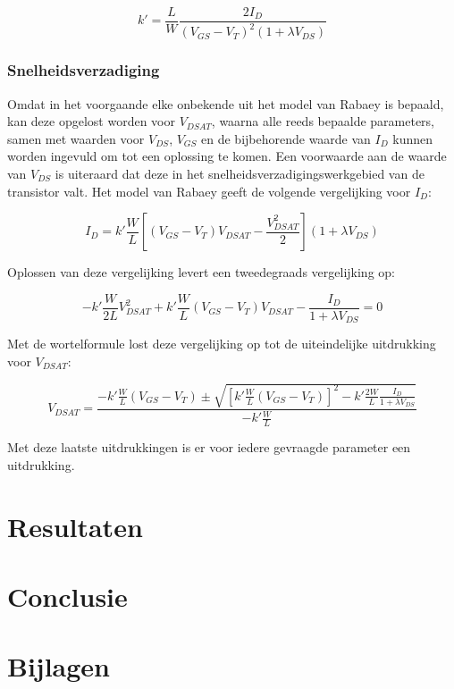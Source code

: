 \documentclass{article}
\begin{document}
\begin{equation} \label{eq:ump-kprime}
	k' = \frac{L}{W}\frac{2I_{D}}{(V_{GS} - V_{T})^2(1 + \lambda V_{DS})}
\end{equation}

\subsubsection{Snelheidsverzadiging}
\label{subsubsec:ump-methode-verw-lambda}
Omdat in het voorgaande elke onbekende uit het model van Rabaey is bepaald, kan deze opgelost worden voor $V_{DSAT}$, waarna alle reeds bepaalde parameters, samen met waarden voor $V_{DS}$, $V_{GS}$ en de bijbehorende waarde van $I_{D}$ kunnen worden ingevuld om tot een oplossing te komen. Een voorwaarde aan de waarde van $V_{DS}$ is uiteraard dat deze in het snelheidsverzadigingswerkgebied van de transistor valt. Het model van Rabaey geeft de volgende vergelijking voor $I_{D}$:

\begin{equation}
	I_{D} = k' \frac{W}{L}[(V_{GS} - V_{T})V_{DSAT} - \frac{V_{DSAT}^2}{2}](1 + \lambda V_{DS})
\end{equation}

Oplossen van deze vergelijking levert een tweedegraads vergelijking op:

$$-k'\frac{W}{2L}V_{DSAT}^2 + k'\frac{W}{L}(V_{GS}-V_{T})V_{DSAT} - \frac{I_{D}}{1 + \lambda V_{DS}} = 0$$

Met de wortelformule lost deze vergelijking op tot de uiteindelijke uitdrukking voor $V_{DSAT}$:

\begin{equation} \label{eq:ump-vdsat}
	V_{DSAT} = \frac{-k'\frac{W}{L}(V_{GS}-V_{T}) \pm \sqrt{[k'\frac{W}{L}(V_{GS}-V_{T})]^2 - k'\frac{2W}{L}\frac{I_{D}}{1 + \lambda V_{DS}}}}{-k'\frac{W}{L}}
\end{equation}

Met deze laatste uitdrukkingen is er voor iedere gevraagde parameter een uitdrukking.

\section{Resultaten}
\label{sec:ump-res}

\section{Conclusie}
\label{sec:ump-conclusie}

\printbibliography

\section{Bijlagen}
\label{sec:ump-bijlagen}
\end{document}
